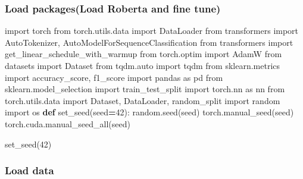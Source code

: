 \documentclass[
]{article}
\newenvironment{Shaded}{\begin{snugshade}}{\end{snugshade}}
\newcommand{\DecValTok}[1]{\textcolor[rgb]{0.00,0.00,0.81}{#1}}
\newcommand{\ImportTok}[1]{#1}
\newcommand{\KeywordTok}[1]{\textcolor[rgb]{0.13,0.29,0.53}{\textbf{#1}}}
\newcommand{\NormalTok}[1]{#1}
\newcommand{\OperatorTok}[1]{\textcolor[rgb]{0.81,0.36,0.00}{\textbf{#1}}}
\begin{document}
\subsubsection{Load packages(Load Roberta and fine
tune)}\label{load-packagesload-roberta-and-fine-tune}

\begin{Shaded}
\begin{Highlighting}[]
\ImportTok{import}\NormalTok{ torch}
\ImportTok{from}\NormalTok{ torch.utils.data }\ImportTok{import}\NormalTok{ DataLoader}
\ImportTok{from}\NormalTok{ transformers }\ImportTok{import}\NormalTok{ AutoTokenizer, AutoModelForSequenceClassification}
\ImportTok{from}\NormalTok{ transformers }\ImportTok{import}\NormalTok{ get\_linear\_schedule\_with\_warmup}
\ImportTok{from}\NormalTok{ torch.optim }\ImportTok{import}\NormalTok{ AdamW}
\ImportTok{from}\NormalTok{ datasets }\ImportTok{import}\NormalTok{ Dataset}
\ImportTok{from}\NormalTok{ tqdm.auto }\ImportTok{import}\NormalTok{ tqdm}
\ImportTok{from}\NormalTok{ sklearn.metrics }\ImportTok{import}\NormalTok{ accuracy\_score, f1\_score}
\ImportTok{import}\NormalTok{ pandas }\ImportTok{as}\NormalTok{ pd}
\ImportTok{from}\NormalTok{ sklearn.model\_selection }\ImportTok{import}\NormalTok{ train\_test\_split}
\ImportTok{import}\NormalTok{ torch.nn }\ImportTok{as}\NormalTok{ nn}
\ImportTok{from}\NormalTok{ torch.utils.data }\ImportTok{import}\NormalTok{ Dataset, DataLoader, random\_split}
\ImportTok{import}\NormalTok{ random}
\ImportTok{import}\NormalTok{ os}
\KeywordTok{def}\NormalTok{ set\_seed(seed}\OperatorTok{=}\DecValTok{42}\NormalTok{):}
\NormalTok{    random.seed(seed)}
\NormalTok{    torch.manual\_seed(seed)}
\NormalTok{    torch.cuda.manual\_seed\_all(seed)}

\NormalTok{set\_seed(}\DecValTok{42}\NormalTok{)}
\end{Highlighting}
\end{Shaded}

\subsubsection{Load data}\label{load-data}
\end{document}
